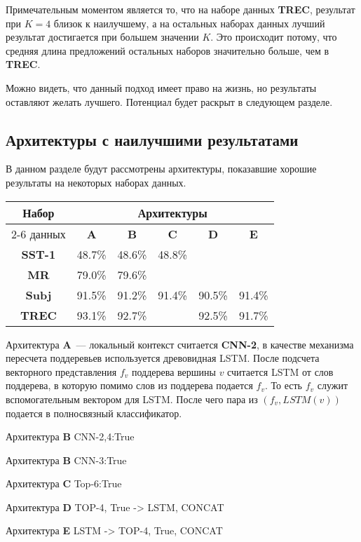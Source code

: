 Примечательным моментом является то, что на наборе данных \textbf{TREC}, результат при $K=4$ близок к наилучшему, а на остальных наборах данных лучший результат достигается при большем значении $K$.
Это происходит потому, что средняя длина предложений остальных наборов значительно больше, чем в \textbf{TREC}.

Можно видеть, что данный подход имеет право на жизнь, но результаты оставляют желать лучшего.
Потенциал  будет раскрыт в следующем разделе.

\subsection{Архитектуры с наилучшими результатами}

В данном разделе будут рассмотрены архитектуры, показавшие хорошие результаты на некоторых наборах данных.

\vspace{5mm}
\begin{minipage}{\linewidth}
 \label{tab:title} 
\begin{tabular}{|c|c|c|c|c|c|}
\hline
\multirow{2}{*}{Набор}   &             \multicolumn{5}{c|}{Архитектуры} \\ \cline{2-6} 
     данных              &  \textbf{A}  & \textbf{B} & \textbf{C} & \textbf{D} & \textbf{E} \\ \hline
\textbf{SST-1}           & 48.7\%       & 48.6\%     & 48.8\%     &            &            \\ \hline
\textbf{MR}              & 79.0\%       & 79.6\%     &            &            &            \\ \hline
\textbf{Subj}            & 91.5\%       & 91.2\%     & 91.4\%     & 90.5\%     & 91.4\%     \\ \hline
\textbf{TREC}            & 93.1\%       & 92.7\%     &            & 92.5\%     & 91.7\%      \\ \hline
\end{tabular}
\end{minipage}
\vspace{5mm}

Архитектура \textbf{A}~--- локальный контекст считается \textbf{CNN-2}, в качестве механизма пересчета поддеревьев используется древовидная LSTM. После подсчета векторного представления $f_v$ поддерева вершины $v$ считается LSTM от слов поддерева, в которую помимо слов из поддерева подается $f_v$. То есть $f_v$ служит вспомогательным вектором для
LSTM. После чего пара из $(f_v, LSTM(v))$ подается в полносвязный классификатор.

Архитектура \textbf{B} CNN-2,4:True

Архитектура \textbf{B} CNN-3:True

Архитектура \textbf{C} Top-6:True

Архитектура \textbf{D} TOP-4, True -> LSTM, CONCAT

Архитектура \textbf{E} LSTM -> TOP-4, True, CONCAT